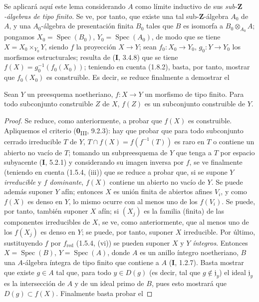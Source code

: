 Se aplicará aquí este lema considerando $A$ como límite inductivo de sus
\emph{sub-$\mathbf Z$-álgebras de tipo finito}. Se ve, por tanto, que existe una
tal sub-$\mathbf Z$-álgebra $A_0$ de $A$, y una $A_0$-álgebra de
presentación finita $B_0$ tales que $B$ es isomorfa a
$B_0\otimes_{A_0}A$; pongamos $X_0=\operatorname{Spec}(B_0)$,
$Y_0=\operatorname{Spec}(A_0)$, de modo que se tiene $X=X_0\times_{Y_0}Y$,
siendo $f$ la proyección $X\to Y$; sean $f_0:X_0\to Y_0$,
$g_0:Y\to Y_0$ los morfismos estructurales; resulta de (\textbf{I}, 3.4.8) que
se tiene $f(X)=g_0^{-1}(f_0(X_0))$; teniendo en cuenta (1.8.2), basta, por tanto,
mostrar que $f_0(X_0)$ es construible. Es decir, se reduce finalmente
a demostrar el

\begin{corollary}[1.8.5]
\label{IV.1.8.5-fr}
Sean $Y$ un preesquema noetheriano, $f:X\to Y$ un morfismo de tipo finito.
Para todo subconjunto construible $Z$ de $X$, $f(Z)$ es un subconjunto
construible de $Y$.
\end{corollary}


\begin{proof}
Se reduce, como anteriormente, a probar que $f(X)$ es construible.
Apliquemos el criterio (\textbf{0}\textsubscript{III}, 9.2.3): hay que probar que para
todo subconjunto cerrado irreducible $T$ de $Y$, $T\cap f(X)=f(f^{-1}(T))$ es
raro en $T$ o contiene un abierto no vacío de $T$; tomando un
subpreesquema de $Y$ que tenga a $T$ por espacio subyacente (\textbf{I}, 5.2.1) y
considerando su imagen inversa por $f$, se ve finalmente (teniendo en cuenta
(1.5.4, (iii)) que se reduce a probar que, si se supone $Y$
\emph{irreducible} y $f$ \emph{dominante}, $f(X)$ contiene un abierto no vacío de
$Y$. Se puede además suponer $Y$ afín; entonces $X$ es unión finita
de abiertos afines $V_i$, y como $f(X)$ es denso en $Y$, lo mismo ocurre
con al menos uno de los $f(V_i)$. Se puede, por tanto, también suponer $X$ afín; si
$(X_j)$ es la familia (finita) de las componentes irreducibles de $X$, se ve,
como anteriormente, que al menos uno de los $f(X_j)$ es denso en $Y$; se puede, por tanto,
suponer $X$ irreducible. Por último, sustituyendo $f$ por $f_{\mathrm{red}}$
(1.5.4, (vi)) se pueden suponer $X$ y $Y$ \emph{íntegros}. Entonces
$X=\operatorname{Spec}(B)$, $Y=\operatorname{Spec}(A)$, donde $A$ es un
anillo íntegro noetheriano, $B$ una $A$-álgebra íntegra de tipo finito que contiene
a $A$ (\textbf{I}, 1.2.7). Basta mostrar que existe $g\in A$ tal que, para todo
$y\in D(g)$ (es decir, tal que $g\notin\mathfrak j_y$) el ideal
$\mathfrak j_y$ es la intersección de $A$ y de un ideal primo de $B$, pues
esto mostrará que $D(g)\subset f(X)$. Finalmente basta probar el
\end{proof}

